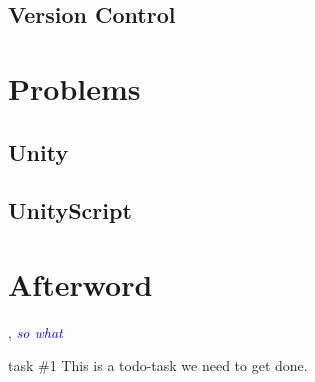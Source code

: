 \documentclass[BSP,english,oneside]{classes/gucthesis}
\newcommand{\comment}[1]{\textcolor{blue}{\emph{#1}}}
\newcommand{\todo}[1]{{\color{green}#1}}
\begin{document}
	\section{Version Control}
	


\chapter{Problems}
	\label{chap:problems}
	\section{Unity}
	

	\section{UnityScript}
	


\chapter{Afterword}
	\label{chap:afterword}
	




\appendix %
\appendixpage
\addappheadtotoc







\GUC, 
\comment{so what}

\todo{task \#1}
This is a todo-task we need to get done.
\end{document}
